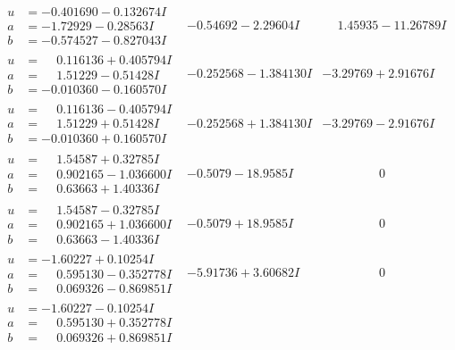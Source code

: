 \documentclass[1p]{elsarticle_modified}
\theoremstyle{definition}
\begin{document}
$$\begin{array}{c|c|c}
\begin{aligned}
u &= -0.401690 - 0.132674 I \\
a &= -1.72929 - 0.28563 I \\
b &= -0.574527 - 0.827043 I\end{aligned}
 & -0.54692 - 2.29604 I & \phantom{-}1.45935 - 11.26789 I \\ \hline\begin{aligned}
u &= \phantom{-}0.116136 + 0.405794 I \\
a &= \phantom{-}1.51229 - 0.51428 I \\
b &= -0.010360 - 0.160570 I\end{aligned}
 & -0.252568 - 1.384130 I & -3.29769 + 2.91676 I \\ \hline\begin{aligned}
u &= \phantom{-}0.116136 - 0.405794 I \\
a &= \phantom{-}1.51229 + 0.51428 I \\
b &= -0.010360 + 0.160570 I\end{aligned}
 & -0.252568 + 1.384130 I & -3.29769 - 2.91676 I \\ \hline\begin{aligned}
u &= \phantom{-}1.54587 + 0.32785 I \\
a &= \phantom{-}0.902165 - 1.036600 I \\
b &= \phantom{-}0.63663 + 1.40336 I\end{aligned}
 & -0.5079 - 18.9585 I & \phantom{-0.000000 } 0 \\ \hline\begin{aligned}
u &= \phantom{-}1.54587 - 0.32785 I \\
a &= \phantom{-}0.902165 + 1.036600 I \\
b &= \phantom{-}0.63663 - 1.40336 I\end{aligned}
 & -0.5079 + 18.9585 I & \phantom{-0.000000 } 0 \\ \hline\begin{aligned}
u &= -1.60227 + 0.10254 I \\
a &= \phantom{-}0.595130 - 0.352778 I \\
b &= \phantom{-}0.069326 - 0.869851 I\end{aligned}
 & -5.91736 + 3.60682 I & \phantom{-0.000000 } 0 \\ \hline\begin{aligned}
u &= -1.60227 - 0.10254 I \\
a &= \phantom{-}0.595130 + 0.352778 I \\
b &= \phantom{-}0.069326 + 0.869851 I\end{aligned}

\end{array}$$
\end{document}
